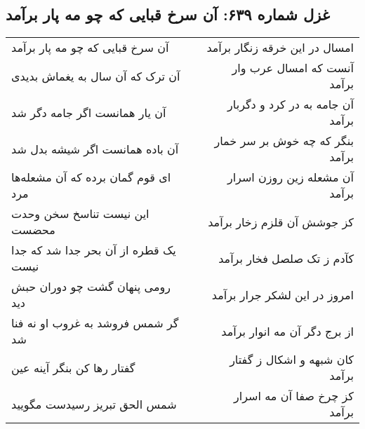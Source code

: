 \begin{center}
\section*{غزل شماره ۶۳۹: آن سرخ قبایی که چو مه پار برآمد}
\label{sec:0639}
\begin{longtable}{l p{0.5cm} r}
آن سرخ قبایی که چو مه پار برآمد
&&
امسال در این خرقه زنگار برآمد
\\
آن ترک که آن سال به یغماش بدیدی
&&
آنست که امسال عرب وار برآمد
\\
آن یار همانست اگر جامه دگر شد
&&
آن جامه به در کرد و دگربار برآمد
\\
آن باده همانست اگر شیشه بدل شد
&&
بنگر که چه خوش بر سر خمار برآمد
\\
ای قوم گمان برده که آن مشعله‌ها مرد
&&
آن مشعله زین روزن اسرار برآمد
\\
این نیست تناسخ سخن وحدت محضست
&&
کز جوشش آن قلزم زخار برآمد
\\
یک قطره از آن بحر جدا شد که جدا نیست
&&
کآدم ز تک صلصل فخار برآمد
\\
رومی پنهان گشت چو دوران حبش دید
&&
امروز در این لشکر جرار برآمد
\\
گر شمس فروشد به غروب او نه فنا شد
&&
از برج دگر آن مه انوار برآمد
\\
گفتار رها کن بنگر آینه عین
&&
کان شبهه و اشکال ز گفتار برآمد
\\
شمس الحق تبریز رسیدست مگویید
&&
کز چرخ صفا آن مه اسرار برآمد
\\
\end{longtable}
\end{center}
